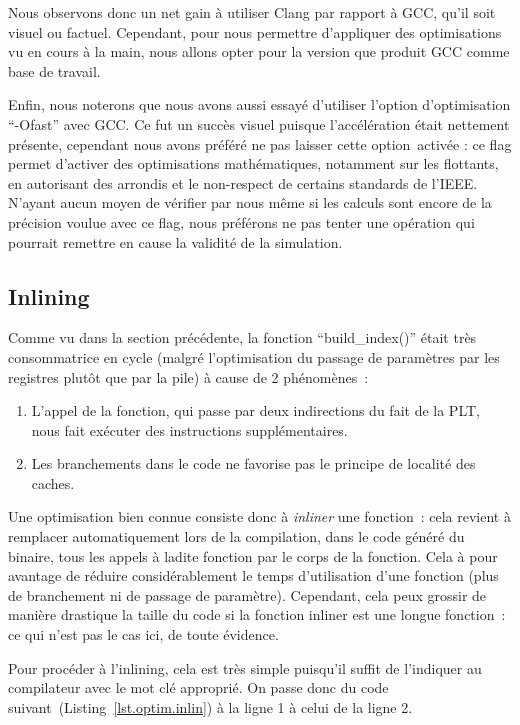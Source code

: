 \documentclass[12pt,a4paper]{article}
\begin{document}
Nous observons donc un net gain à utiliser Clang par rapport à \ac{GCC}, qu'il
soit visuel ou factuel. Cependant, pour nous permettre d’appliquer des
optimisations vu en cours à la main, nous allons opter pour la version que
produit \ac{GCC} comme base de travail.

Enfin, nous noterons que nous avons aussi essayé d’utiliser l’option
d’optimisation \enquote{-Ofast} avec \ac{GCC}. Ce fut un succès visuel puisque
l’accélération était nettement présente, cependant nous avons préféré ne pas
laisser cette option activée : ce flag permet d’activer des optimisations
mathématiques, notamment sur les flottants, en autorisant des arrondis et le
non-respect de certains standards de l'\ac{IEEE}. N’ayant aucun moyen de vérifier par
nous même si les calculs sont encore de la précision voulue avec ce flag, nous
préférons ne pas tenter une opération qui pourrait remettre en cause la validité
de la simulation.

\subsection{Inlining}
\label{sub.optim.inlin}

Comme vu dans la section précédente, la fonction \enquote{build\_index()} était
très consommatrice en cycle (malgré l’optimisation du passage de paramètres par
les registres plutôt que par la pile) à cause de 2 phénomènes :
\begin{enumerate}
    \item L’appel de la fonction, qui passe par deux indirections du fait de la
        \ac{PLT}, nous fait exécuter des instructions supplémentaires.
    \item Les branchements dans le code ne favorise pas le principe de localité
        des caches.
\end{enumerate}

Une optimisation bien connue consiste donc à \textit{inliner} une fonction :
cela revient à remplacer automatiquement lors de la compilation, dans le code
généré du binaire, tous les appels à ladite fonction par le corps de la
fonction. Cela à pour avantage de réduire considérablement le temps
d’utilisation d’une fonction (plus de branchement ni de passage de paramètre).
Cependant, cela peux grossir de manière drastique la taille du code si la
fonction inliner est une longue fonction : ce qui n’est pas le cas ici, de toute
évidence.

Pour procéder à l’inlining, cela est très simple puisqu’il suffit de l’indiquer
au compilateur avec le mot clé approprié. On passe donc du code
suivant (Listing~\ref{lst.optim.inlin}) à la ligne 1 à celui de la ligne 2.
\end{document}
